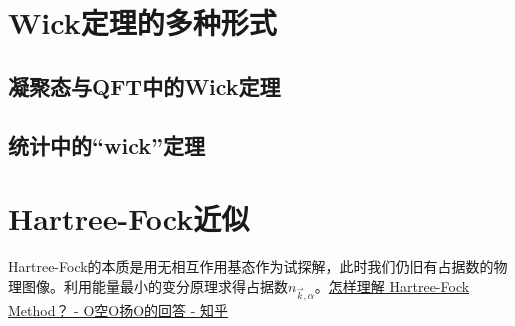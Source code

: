 \documentclass[10pt,openany]{book}
\theoremstyle{thmstyle} %
\theoremstyle{defstyle} %
\theoremstyle{prostyle} %
\begin{document}
\section{Wick定理的多种形式}
\subsection{凝聚态与QFT中的Wick定理}
\subsection{统计中的“wick”定理}
\section{Hartree-Fock近似}
Hartree-Fock的本质是用无相互作用基态作为试探解，此时我们仍旧有占据数的物理图像。利用能量最小的变分原理求得占据数$ n_{\vec{k},\alpha} $。\href{https://www.zhihu.com/question/29462902/answer/2967943520}{怎样理解 Hartree-Fock Method？ - O空O扬O的回答 - 知乎}
\end{document}
